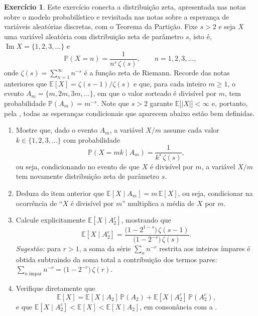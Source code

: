 \documentclass[12pt,portuguese]{article}
\theoremstyle{definition}
\newtheorem{exercise}{Exercício}
\begin{document}
\begin{exercise}\label{exercise:zeta-esperanca-condicional}
Este exercício conecta a distribuição zeta, apresentada nas notas sobre o
modelo probabilístico e revisitada nas notas sobre a esperança de variáveis
aleatórias discretas, com o Teorema da Partição. Fixe \(s > 2\) e seja \(X\)
uma variável aleatória com distribuição zeta de parâmetro \(s\), isto é,
\(\operatorname{Im} X = \{1, 2, 3, \ldots\}\) e
\[
\mathbb{P}(X = n) = \frac{1}{n^{s}\,\zeta(s)}, \qquad n = 1, 2, 3, \ldots,
\]
onde \(\zeta(s) = \sum_{n=1}^{\infty} n^{-s}\) é a função zeta de Riemann.
Recorde das notas anteriores que \(\mathbb{E}[X] = \zeta(s-1)/\zeta(s)\) e
que, para cada inteiro \(m \geqslant 1\), o evento
\(A_m = \{m, 2m, 3m, \ldots\}\), em que o valor sorteado é divisível por
\(m\), tem probabilidade \(\mathbb{P}(A_m) = m^{-s}\). Note que \(s > 2\)
garante \(\mathbb{E}\bigl[|X|\bigr] < \infty\) e, portanto, pela
, todas as esperanças
condicionais que aparecem abaixo estão bem definidas.
\begin{enumerate}[label=(\alph*)]
  \item Mostre que, dado o evento \(A_m\), a variável \(X/m\) assume cada
        valor \(k \in \{1, 2, 3, \ldots\}\) com probabilidade
        \[
        \mathbb{P}(X = mk \mid A_m) = \frac{1}{k^{s}\,\zeta(s)},
        \]
        ou seja, condicionando no evento de que \(X\) é divisível por
        \(m\), a variável \(X/m\) tem novamente distribuição zeta de
        parâmetro \(s\).
  \item Deduza do item anterior que
        \(\mathbb{E}[X \mid A_m] = m\,\mathbb{E}[X]\), ou seja, condicionar
        na ocorrência de ``\(X\) é divisível por \(m\)'' multiplica a média
        de \(X\) por \(m\).
  \item Calcule explicitamente \(\mathbb{E}[X \mid A_2^c]\), mostrando que
        \[
        \mathbb{E}[X \mid A_2^c]
        = \frac{\bigl(1 - 2^{1-s}\bigr)\,\zeta(s-1)}
               {\bigl(1 - 2^{-s}\bigr)\,\zeta(s)}.
        \]
        \emph{Sugestão:} para \(r > 1\), a soma da série
        \(\sum_{n} n^{-r}\) restrita aos inteiros ímpares é obtida
        subtraindo da soma total a contribuição dos termos pares:
        \(\sum_{n \text{ ímpar}} n^{-r} = \bigl(1 - 2^{-r}\bigr)\,\zeta(r)\).
  \item Verifique diretamente que
        \[
        \mathbb{E}[X]
        = \mathbb{E}[X \mid A_2]\,\mathbb{P}(A_2)
        + \mathbb{E}[X \mid A_2^c]\,\mathbb{P}(A_2^c),
        \]
        e que
        \(\mathbb{E}[X \mid A_2^c] < \mathbb{E}[X] < \mathbb{E}[X \mid A_2]\),
        em consonância com a .
\end{enumerate}
\end{exercise}
\end{document}
